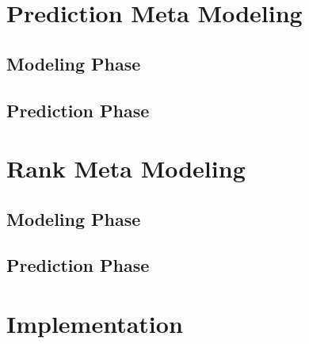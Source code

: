 \section{Prediction Meta Modeling}

\subsection{Modeling Phase}

\begin{figure*}
  
\end{figure*}

\begin{figure*}
  
\end{figure*}


\subsection{Prediction Phase}

\begin{figure*}
  
\end{figure*}

\begin{figure*}
  
\end{figure*}






\section{Rank Meta Modeling}
\label{sec:methods:rank}

\subsection{Modeling Phase}

\subsection{Prediction Phase}

\section{Implementation}
